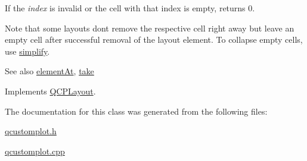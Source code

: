 If the {\itshape index} is invalid or the cell with that index is empty, returns 0.

Note that some layouts don\textquotesingle{}t remove the respective cell right away but leave an empty cell after successful removal of the layout element. To collapse empty cells, use \hyperlink{classQCPLayoutInset_abb9eb23bf2d7c587a8abe02d065eae0a}{simplify}.

\begin{DoxySeeAlso}{See also}
\hyperlink{classQCPLayoutInset_ab096d07b08f9b5455647f3ba7ff60e27}{element\+At}, \hyperlink{classQCPLayoutInset_a9ac707ccff650633b97f52dd5cddcf49}{take} 
\end{DoxySeeAlso}


Implements \hyperlink{classQCPLayout_a5a79621fa0a6eabb8b520cfc04fb601a}{Q\+C\+P\+Layout}.



The documentation for this class was generated from the following files\+:\begin{DoxyCompactItemize}
\item 
\hyperlink{qcustomplot_8h}{qcustomplot.\+h}\item 
\hyperlink{qcustomplot_8cpp}{qcustomplot.\+cpp}\end{DoxyCompactItemize}
